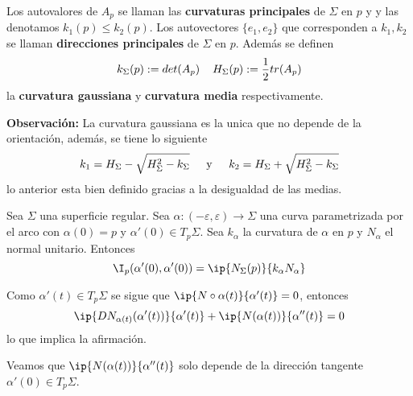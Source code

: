 \documentclass{article}
\begin{document}
\begin{dfn}
    Los autovalores de $A_{p}$ se llaman las \textbf{curvaturas principales} de $\Sigma$ en $p$ y
    y las denotamos $k_{1}(p)\leq k_{2}(p)$. Los autovectores $\{e_{1},e_{2}\}$ que corresponden a 
    $k_{1},k_{2}$ se llaman \textbf{direcciones principales} de $\Sigma$ en $p$. Además se definen
    \begin{equation*}
        k_{\Sigma}(p):=det(A_{p})\hspace{4mm}H_{\Sigma}(p):=\frac{1}{2}tr(A_{p})
    \end{equation*}
    la \textbf{curvatura gaussiana} y \textbf{curvatura media} respectivamente.
\end{dfn}
\noindent\textbf{Observación:} La curvatura gaussiana es la unica que no depende de la orientación,
además, se tiene lo siguiente
\begin{equation*}
    k_{1}=H_{\Sigma}-\sqrt{H_{\Sigma}^{2}-k_{\Sigma}}\hspace{4mm}\text{ y }\hspace{4mm}
    k_{2}=H_{\Sigma}+\sqrt{H_{\Sigma}^{2}-k_{\Sigma}}
\end{equation*}
lo anterior esta bien definido gracias a la desigualdad de las medias.
\begin{prop}
    Sea $\Sigma$ una superficie regular. Sea $\alpha:(-\varepsilon,\varepsilon)\to\Sigma$ una 
    curva parametrizada por el arco con $\alpha(0)=p$ y $\alpha'(0)\in T_{p}\Sigma$. Sea 
    $k_{\alpha}$ la curvatura de $\alpha$ en $p$ y $N_{\alpha}$ el normal unitario. Entonces
    \begin{equation*}
        \I_{p}(\alpha'(0),\alpha'(0))=\ip{N_{\Sigma}(p)}{k_{\alpha}N_{\alpha}}
    \end{equation*}
\end{prop}
\begin{dem}
    Como $\alpha'(t)\in T_{p}\Sigma$ se sigue que $\ip{N\circ\alpha(t)}{\alpha'(t)}=0$, entonces
    \begin{equation*}
        \ip{DN_{\alpha(t)}(\alpha'(t))}{\alpha'(t)}+\ip{N(\alpha(t))}{\alpha''(t)}=0
    \end{equation*}
    lo que implica la afirmación.
\end{dem}
Veamos que $\ip{N(\alpha(t))}{\alpha''(t)}$ solo depende de la dirección tangente $\alpha'(0)\in 
T_{p}\Sigma$.
\end{document}
